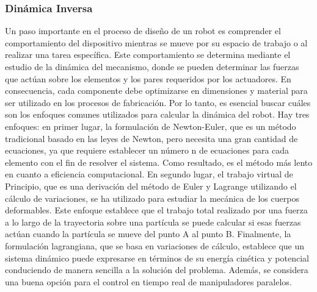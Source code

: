     \newpage


    \subsubsection{Dinámica Inversa}
    
        Un paso importante en el proceso de diseño de un robot es comprender el comportamiento del dispositivo mientras se mueve por su espacio de trabajo o al realizar una tarea específica. Este comportamiento se determina mediante el estudio de la dinámica del mecanismo, donde se pueden determinar las fuerzas que actúan sobre los elementos y los pares requeridos por los actuadores. En consecuencia, cada componente debe optimizarse en dimensiones y material para ser utilizado en los procesos de fabricación. Por lo tanto, es esencial buscar cuáles son los enfoques comunes utilizados para calcular la dinámica del robot. Hay tres enfoques: en primer lugar, la formulación de Newton-Euler, que es un método tradicional basado en las leyes de Newton, pero necesita una gran cantidad de ecuaciones, ya que requiere establecer un número n de ecuaciones para cada elemento con el fin de resolver el sistema. Como resultado, es el método más lento en cuanto a eficiencia computacional. En segundo lugar, el trabajo virtual de Principio, que es una derivación del método de Euler y Lagrange utilizando el cálculo de variaciones, se ha utilizado para estudiar la mecánica de los cuerpos deformables. Este enfoque establece que el trabajo total realizado por una fuerza a lo largo de la trayectoria sobre una partícula se puede calcular si esas fuerzas actúan cuando la partícula se mueve del punto A al punto B. Finalmente, la formulación lagrangiana, que se basa en variaciones de cálculo, establece que un sistema dinámico puede expresarse en términos de su energía cinética y potencial conduciendo de manera sencilla a la solución del problema. Además, se considera una buena opción para el control en tiempo real de manipuladores paralelos.
    

